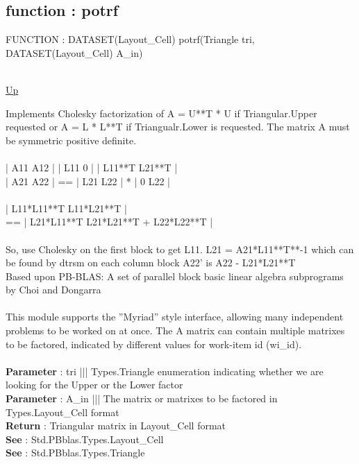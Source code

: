 \subsection*{function : potrf}
\hypertarget{ecldoc:pbblas.potrf}{FUNCTION : DATASET(Layout\_Cell) potrf(Triangle tri, DATASET(Layout\_Cell) A\_in)} \\
\hyperlink{ecldoc:}{Up} \\
\par
Implements Cholesky factorization of A = U**T * U if Triangular.Upper requested or A = L * L**T if Triangualr.Lower is requested. The matrix A must be symmetric positive definite.  \\
 \\
  | A11   A12 |      |  L11   0   |    | L11**T     L21**T | \\
  | A21   A22 |  ==  |  L21   L22 | *  |  0           L22  | \\
 \\
                     | L11*L11**T          L11*L21**T      | \\
                 ==  | L21*L11**T  L21*L21**T + L22*L22**T | \\
  \\
 So, use Cholesky on the first block to get L11. L21 = A21*L11**T**-1 which can be found by dtrsm on each column block A22' is A22 - L21*L21**T  \\
 Based upon PB-BLAS: A set of parallel block basic linear algebra subprograms by Choi and Dongarra  \\
 \\
 This module supports the ''Myriad'' style interface, allowing many independent problems to be worked on at once. The A matrix can contain multiple matrixes to be factored, indicated by different values for work-item id (wi\_id). \\
 \\
\textbf{Parameter} : tri ||| Types.Triangle enumeration indicating whether we are looking for the Upper or the Lower factor \\
\textbf{Parameter} : A\_in ||| The matrix or matrixes to be factored in Types.Layout\_Cell format \\
\textbf{Return} : Triangular matrix in Layout\_Cell format \\
\textbf{See} : Std.PBblas.Types.Layout\_Cell \\
\textbf{See} : Std.PBblas.Types.Triangle \\
